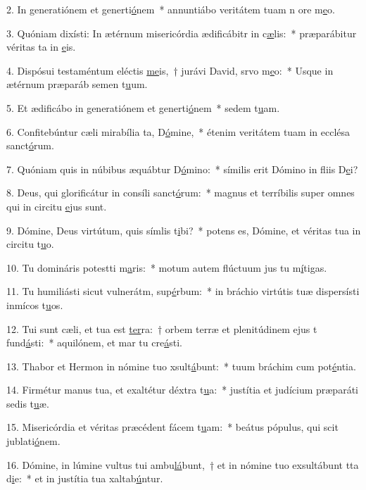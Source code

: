2. In generatiónem et generti\uline{ó}nem~* annuntiábo veritátem tuam n ore m\uline{e}o.\par 
3. Quóniam dixísti: In ætérnum misericórdia ædificábitr in c\uline{æ}lis:~* præparábitur véritas ta in \uline{e}is.\par 
4. Dispósui testaméntum eléctis \uline{me}is,~† jurávi David, srvo m\uline{e}o:~* Usque in ætérnum præparáb semen t\uline{u}um.\par 
5. Et ædificábo in generatiónem et generti\uline{ó}nem~* sedem t\uline{u}am.\par 
6. Confitebúntur cæli mirabília ta, D\uline{ó}mine,~* étenim veritátem tuam in ecclésa sanct\uline{ó}rum.\par 
7. Quóniam quis in núbibus æquábtur D\uline{ó}mino:~* símilis erit Dómino in fliis D\uline{e}i?\par 
8. Deus, qui glorificátur in consíli sanct\uline{ó}rum:~* magnus et terríbilis super omnes qui in circitu \uline{e}jus sunt.\par 
9. Dómine, Deus virtútum, quis símlis t\uline{i}bi?~* potens es, Dómine, et véritas tua in circitu t\uline{u}o.\par 
10. Tu domináris potestti m\uline{a}ris:~* motum autem flúctuum jus tu m\uline{í}tigas.\par 
11. Tu humiliásti sicut vulnerátm, sup\uline{é}rbum:~* in bráchio virtútis tuæ dispersísti inmícos t\uline{u}os.\par 
12. Tui sunt cæli, et tua est \uline{ter}ra:~† orbem terræ et plenitúdinem ejus t fund\uline{á}sti:~* aquilónem, et mar tu cre\uline{á}sti.\par 
13. Thabor et Hermon in nómine tuo xsult\uline{á}bunt:~* tuum bráchim cum pot\uline{é}ntia.\par 
14. Firmétur manus tua, et exaltétur déxtra t\uline{u}a:~* justítia et judícium præparáti sedis t\uline{u}æ.\par 
15. Misericórdia et véritas præcédent fácem t\uline{u}am:~* beátus pópulus, qui scit jublati\uline{ó}nem.\par 
16. Dómine, in lúmine vultus tui ambu\uline{lá}bunt,~† et in nómine tuo exsultábunt tta d\uline{i}e:~* et in justítia tua xaltab\uline{ú}ntur.\par 
